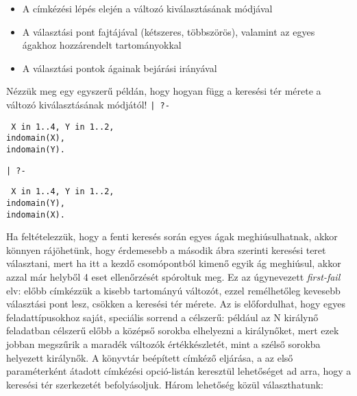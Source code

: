 \begin{itemize}
\item A címkézési lépés elején a változó kiválasztásának módjával
\item A választási pont fajtájával (kétszeres, többszörös), valamint az egyes ágakhoz
hozzárendelt tartományokkal
\item A választási pontok ágainak bejárási irányával
\end{itemize}

Nézzük meg egy egyszerű példán, hogy hogyan függ a keresési tér mérete a változó
kiválasztásának módjától!
\br
{\tt | ?- }\parbox[t]{0.3\textwidth}{\tt
X in 1..4,
Y in 1..2,\\
indomain(X),\\
indomain(Y).
}
\br
{\tt | ?- }\parbox[t]{0.3\textwidth}{\tt
X in 1..4,
Y in 1..2,\\
indomain(Y),\\
indomain(X).
}
\br
Ha feltételezzük, hogy a fenti keresés során egyes ágak meghiúsulhatnak, akkor könnyen
rájöhetünk, hogy érdemesebb a második ábra szerinti keresési teret választani, mert ha
itt a kezdő csomópontból kimenő egyik ág meghiúsul, akkor azzal már helyből 4 eset
ellenőrzését spóroltuk meg. Ez az úgynevezett \emph{first-fail} elv: előbb címkézzük
a kisebb tartományú változót, ezzel remélhetőleg kevesebb választási pont lesz,
csökken a keresési tér mérete. Az is előfordulhat, hogy egyes feladattípusokhoz saját,
speciális sorrend a célszerű: például az N királynő feladatban célszerű előbb a középső
sorokba elhelyezni a királynőket, mert ezek jobban megszűrik a maradék változók
értékkészletét, mint a szélső sorokba helyezett királynők.
\br
A \clpfd könyvtár beépített címkéző eljárása, a  az első paraméterként
átadott címkézési opció-listán keresztül lehetőséget ad arra, hogy a keresési tér
szerkezetét befolyásoljuk. Három lehetőség közül választhatunk:

